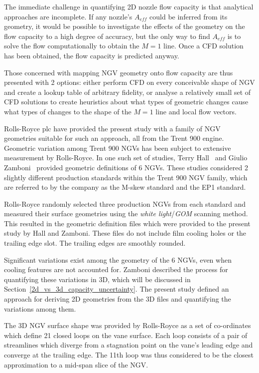 \documentclass[a4paper, 11pt, oneside]{report}
\begin{document}
The immediate challenge in quantifying 2D nozzle flow capacity is that analytical approaches are incomplete. If any nozzle's $A_{eff}$ could be inferred from its geometry, it would be possible to investigate the effects of the geometry on the flow capacity to a high degree of accuracy, but the only way to find $A_{eff}$ is to solve the flow computationally to obtain the $M=1$ line. Once a CFD solution has been obtained, the flow capacity is predicted anyway.

Those concerned with mapping NGV geometry onto flow capacity are thus presented with 2 options: either perform CFD on every conceivable shape of NGV and create a lookup table of arbitrary fidelity, or analyse a relatively small set of CFD solutions to create heuristics about what types of geometric changes cause what types of changes to the shape of the $M=1$ line and local flow vectors.

Rolls-Royce plc have provided the present study with a family of NGV geometries suitable for such an approach, all from the Trent 900 engine. Geometric variation among Trent 900 NGVs has been subject to extensive measurement by Rolls-Royce. In one such set of studies, Terry Hall~\cite{hall_area} and Giulio Zamboni~\cite{zamboni_area} provided geometric definitions of 6 NGVs. These studies considered 2 slightly different production standards within the Trent 900 NGV family, which are referred to by the company as the M-skew standard and the EP1 standard.

Rolls-Royce randomly selected three production NGVs from each standard and measured their surface geometries using the \textit{white light}/\textit{GOM} scanning method. This resulted in the geometric definition files which were provided to the present study by Hall and Zamboni. These files do not include film cooling holes or the trailing edge slot. The trailing edges are smoothly rounded.

Significant variations exist among the geometry of the 6 NGVs, even when cooling features are not accounted for. Zamboni described the process for quantifying these variations in 3D, which will be discussed in Section~\ref{2d_vs_3d_capacity_uncertainty}. The present study defined an approach for deriving 2D geometries from the 3D files and quantifying the variations among them.

The 3D NGV surface shape was provided by Rolls-Royce as a set of co-ordinates which define 21 closed loops on the vane surface. Each loop consists of a pair of streamlines which diverge from a stagnation point on the vane's leading edge and converge at the trailing edge. The 11th loop was thus considered to be the closest approximation to a mid-span slice of the NGV.
\end{document}
